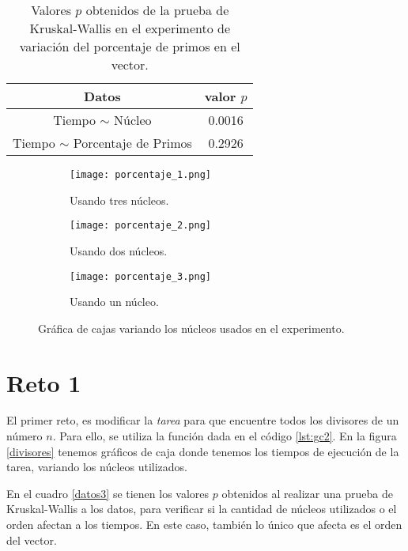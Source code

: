 \documentclass[12pt,letterpaper]{article}
\begin{document}
\begin{table}
\centering
\caption{Valores $p$ obtenidos de la prueba de Kruskal-Wallis en el experimento de variación del porcentaje de primos en el vector.}
\begin{tabular}{|c|c|}
\hline 
Datos & valor $p$ \\ 
\hline 
Tiempo $\sim$ Núcleo & 0.0016 \\ 
\hline 
Tiempo $\sim$ Porcentaje de Primos & 0.2926\\ 
\hline 
\end{tabular} 
\label{datos2}
\end{table}
\begin{figure}
 	\centering
 	\begin{subfigure}[b]{0.45\linewidth}
 		\texttt{[image: porcentaje\_1.png]}
 		 \caption{Usando tres núcleos.}
 		\label{porcentaje3}
 	\end{subfigure}
 	\begin{subfigure}[b]{0.45\linewidth}
 		\texttt{[image: porcentaje\_2.png]}
 		 \caption{Usando dos núcleos.}
 		\label{porcentaje2}
 	\end{subfigure}
 	\begin{subfigure}[b]{0.45\linewidth}
 		\texttt{[image: porcentaje\_3.png]}
 		\caption{Usando un núcleo.}
 		\label{porcentaje1}
 	\end{subfigure}
 	\caption{Gráfica de cajas variando los núcleos usados en el experimento.}  		
\label{porcentaje}
 \end{figure}
 
 \section{Reto 1}
El primer reto, es modificar la \textit{tarea} para que encuentre todos los divisores de un número $n$. Para ello, se utiliza la función dada en el código \ref{lst:gc2}. En la figura \ref{divisores} tenemos gráficos de caja donde tenemos los tiempos de ejecución de la tarea, variando los núcleos utilizados.
 
En el cuadro \ref{datos3} se tienen los valores $p$ obtenidos al realizar una prueba de Kruskal-Wallis a los datos, para verificar si la cantidad de núcleos utilizados o el orden afectan a los tiempos. En este caso, también lo único que afecta es el orden del vector. 
\end{document}
